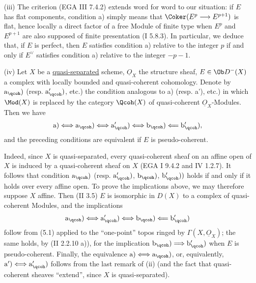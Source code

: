 (iii) The criterion (EGA III 7.4.2) extends word for word to our situation: if \(E\) has flat components, condition a) simply means that \(\Coker(E^p\longrightarrow E^{p+1})\) is flat, hence locally a direct factor of a free Module of finite type when \(E^p\) and \(E^{p+1}\) are also supposed of finite presentation (I 5.8.3). In particular, we deduce that, if \(E\) is perfect, then \(E\) satisfies condition a) relative to the integer \(p\) if and only if \(E^{\vee}\) satisfies condition a) relative to the integer \(-p-1\).

(iv) Let \(X\) be a \uline{quasi-separated} scheme, \(\underline{O}_X\) the structure sheaf, \(E\in\Ob D^-(X)\) a complex with locally bounded and quasi-coherent cohomology. Denote by \(\mathrm a_{\qcoh})\) (resp. \(\mathrm a'_{\qcoh})\), etc.) the condition analogous to a) (resp. a'), etc.) in which \(\Mod(X)\) is replaced by the category \(\Qcoh(X)\) of quasi-coherent \(\underline{O}_X\)-Modules. Then we have
\[
 \mathrm a)\Longleftrightarrow\mathrm a_{\qcoh})\Longleftrightarrow\mathrm a'_{\qcoh})\Longleftrightarrow\mathrm b_{\qcoh})\Longleftarrow\mathrm b'_{\qcoh}),
\]
and the preceding conditions are equivalent if \(E\) is pseudo-coherent.

Indeed, since \(X\) is quasi-separated, every quasi-coherent sheaf on an affine open of \(X\) is induced by a quasi-coherent sheaf on \(X\) (EGA I 9.4.2 and IV 1.2.7). It follows that condition \(\mathrm a_{\qcoh})\) (resp. \(\mathrm a'_{\qcoh})\), \(\mathrm b_{\qcoh})\), \(\mathrm b'_{\qcoh}))\) holds if and only if it holds over every affine open. To prove the implications above, we may therefore suppose \(X\) affine. Then (II 3.5) \(E\) is isomorphic in \(D(X)\) to a complex of quasi-coherent Modules, and the implications
\[
 \mathrm a_{\qcoh})\Longleftrightarrow\mathrm a'_{\qcoh})\Longleftrightarrow\mathrm b_{\qcoh})\Longleftarrow\mathrm b'_{\qcoh})
\]
%
follow from (5.1) applied to the ``one-point'' topos ringed by \(\Gamma(X,\underline{O}_X)\); the same holds, by (II 2.2.10 a)), for the implication \(\mathrm b_{\qcoh})\Longrightarrow\mathrm b'_{\qcoh})\) when \(E\) is pseudo-coherent. Finally, the equivalence \(\mathrm a)\Longleftrightarrow\mathrm a_{\qcoh})\), or, equivalently, \(\mathrm a')\Longleftrightarrow\mathrm a'_{\qcoh})\) follows from the last remark of (ii) (and the fact that quasi-coherent sheaves ``extend'', since \(X\) is quasi-separated).

